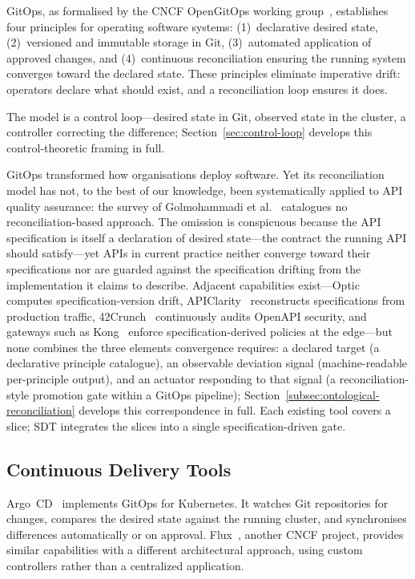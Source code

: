 GitOps, as formalised by the CNCF OpenGitOps working group~\cite{opengitops}, establishes four principles for operating software systems: (1)~declarative desired state, (2)~versioned and immutable storage in Git, (3)~automated application of approved changes, and (4)~continuous reconciliation ensuring the running system converges toward the declared state. These principles eliminate imperative drift: operators declare what should exist, and a reconciliation loop ensures it does.

The model is a control loop---desired state in Git, observed state in the cluster, a controller correcting the difference; Section~\ref{sec:control-loop} develops this control-theoretic framing in full.

GitOps transformed how organisations deploy software. Yet its reconciliation model has not, to the best of our knowledge, been systematically applied to API quality assurance: the survey of Golmohammadi et al.~\cite{api-testing-survey} catalogues no reconciliation-based approach. The omission is conspicuous because the API specification is itself a declaration of desired state---the contract the running API should satisfy---yet APIs in current practice neither converge toward their specifications nor are guarded against the specification drifting from the implementation it claims to describe. Adjacent capabilities exist---Optic~\cite{optic} computes specification-version drift, APIClarity~\cite{apiclarity} reconstructs specifications from production traffic, 42Crunch~\cite{fortyOnecrunch} continuously audits OpenAPI security, and gateways such as Kong~\cite{kong} enforce specification-derived policies at the edge---but none combines the three elements convergence requires: a declared target (a declarative principle catalogue), an observable deviation signal (machine-readable per-principle output), and an actuator responding to that signal (a reconciliation-style promotion gate within a GitOps pipeline); Section~\ref{subsec:ontological-reconciliation} develops this correspondence in full. Each existing tool covers a slice; SDT integrates the slices into a single specification-driven gate.

\subsection{Continuous Delivery Tools}
\label{subsec:cd-tools}

Argo~CD~\cite{argocd} implements GitOps for Kubernetes. It watches Git repositories for changes, compares the desired state against the running cluster, and synchronises differences automatically or on approval. Flux~\cite{flux}, another CNCF project, provides similar capabilities with a different architectural approach, using custom controllers rather than a centralized application.

